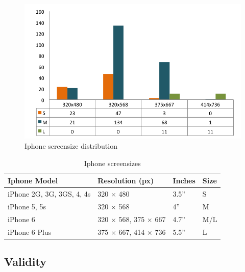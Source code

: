     \begin{figure}[H]
      \centering
      \includegraphics[scale=0.85]{pics/analysis/IphoneScreenDist.png}
      \caption{Iphone screensize distribution}
      \label{fig:iphoneScreenDist}
    \end{figure}

    \begin{table}[H]
      \centering
      \begin{tabular}{ l | l | l | l }
        \hline
        {\bf Iphone Model}  & {\bf Resolution (px)} & {\bf Inches} & {\bf Size} \\ \hline
        iPhone 2G, 3G, 3GS, 4, 4s  &  320 $\times$ 480  &  3.5'' & S\\
        iPhone 5, 5s        &  320 $\times$ 568  &  4'' & M \\
        iPhone 6            &  320 $\times$ 568, 375 $\times$ 667  &  4.7'' & M/L \\
        iPhone 6 Plus       &  375 $\times$ 667, 414 $\times$ 736  &  5.5'' & L \\ \hline        
      \end{tabular}
      \caption{Iphone screensizes}
      \label{tab:iphonescreen}
    \end{table}


  \subsection{Validity}

